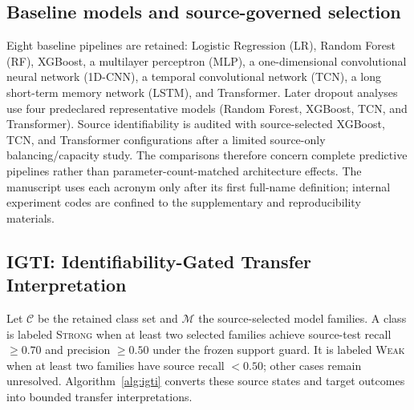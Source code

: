 \documentclass[preprint,12pt]{elsarticle}
\begin{document}
\subsection{Baseline models and source-governed selection}
Eight baseline pipelines are retained: Logistic Regression (LR), Random Forest (RF), XGBoost, a multilayer perceptron (MLP), a one-dimensional convolutional neural network (1D-CNN), a temporal convolutional network (TCN), a long short-term memory network (LSTM), and Transformer. Later dropout analyses use four predeclared representative models (Random Forest, XGBoost, TCN, and Transformer). Source identifiability is audited with source-selected XGBoost, TCN, and Transformer configurations after a limited source-only balancing/capacity study. The comparisons therefore concern complete predictive pipelines rather than parameter-count-matched architecture effects. The manuscript uses each acronym only after its first full-name definition; internal experiment codes are confined to the supplementary and reproducibility materials.

\subsection{IGTI: Identifiability-Gated Transfer Interpretation}
Let $\mathcal{C}$ be the retained class set and $\mathcal{M}$ the source-selected model families. A class is labeled \textsc{Strong} when at least two selected families achieve source-test recall $\ge 0.70$ and precision $\ge 0.50$ under the frozen support guard. It is labeled \textsc{Weak} when at least two families have source recall $<0.50$; other cases remain unresolved. Algorithm~\ref{alg:igti} converts these source states and target outcomes into bounded transfer interpretations.

\begin{algorithm}[H]
\caption{Identifiability-Gated Transfer Interpretation (IGTI)}
\label{alg:igti}
\;
\end{algorithm}
\end{document}
